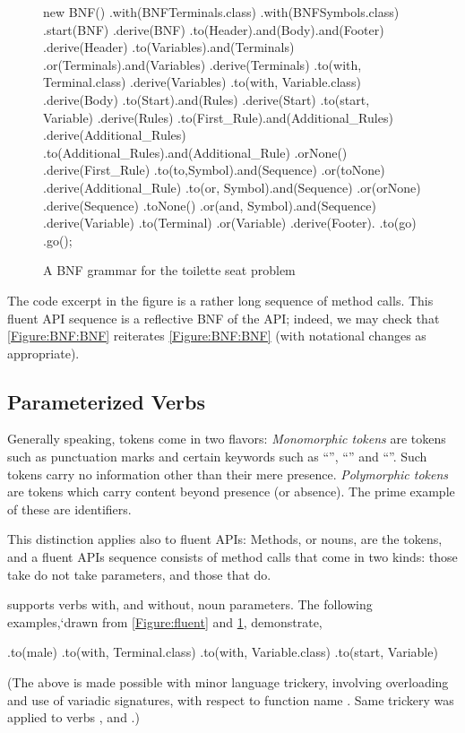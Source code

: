 \begin{figure}[htbp]
  \begin{JAVA}[style=numbered]
new BNF()
  .with(BNFTerminals.class)
  .with(BNFSymbols.class)
  .start(BNF)
  .derive(BNF)
    .to(Header).and(Body).and(Footer)
  .derive(Header)
    .to(Variables).and(Terminals)
    .or(Terminals).and(Variables)
  .derive(Terminals)
    .to(with, Terminal.class)
  .derive(Variables)
    .to(with, Variable.class)
  .derive(Body)
    .to(Start).and(Rules)
  .derive(Start)
    .to(start, Variable)
  .derive(Rules)
    .to(First_Rule).and(Additional_Rules)
  .derive(Additional_Rules)
    .to(Additional_Rules).and(Additional_Rule)
    .orNone()
  .derive(First_Rule)
    .to(to,Symbol).and(Sequence)
    .or(toNone)
  .derive(Additional_Rule)
    .to(or, Symbol).and(Sequence)
    .or(orNone)
  .derive(Sequence)
    .toNone()
    .or(and, Symbol).and(Sequence)
  .derive(Variable)
    .to(Terminal)
    .or(Variable)
  .derive(Footer).
     .to(go)
.go();\end{JAVA}
  \caption{A BNF grammar for the toilette seat problem}
  \label{Figure:BNF:fluent}
\end{figure}

The code excerpt in the figure is a rather long
  sequence of method calls.
This fluent API sequence is a reflective BNF 
  of the \SELF API;
  indeed, we may check that \cref{Figure:BNF:BNF} reiterates \cref{Figure:BNF:BNF}
  (with notational changes as appropriate). 

\subsection{Parameterized Verbs}
Generally speaking, tokens come in two flavors: 
  \emph{Monomorphic tokens} are tokens such as punctuation marks and certain keywords  
    such as ``'', ``'' and ``''. 
Such tokens carry no information other than their mere presence.
\emph{Polymorphic tokens} are tokens which carry content beyond presence (or absence). 
The prime example of these are identifiers. 

This distinction applies also to fluent APIs:
Methods, or nouns, are the tokens, and a fluent APIs sequence consists of 
  method calls that come in two kinds: those take do not take parameters, and those that do.

\SELF supports verbs with, and without, noun parameters. 
The following examples,`drawn from \cref{Figure:fluent} and \cref{Figure:BNF:fluent},
  demonstrate, 
\begin{JAVA}
    .to(male)
    .to(with, Terminal.class)
    .to(with, Variable.class)
    .to(start, Variable)\end{JAVA}
(The above is made possible with minor \Java language trickery,
  involving overloading and use of variadic signatures,
  with respect to function name .
Same trickery was applied to verbs , and .)



  
